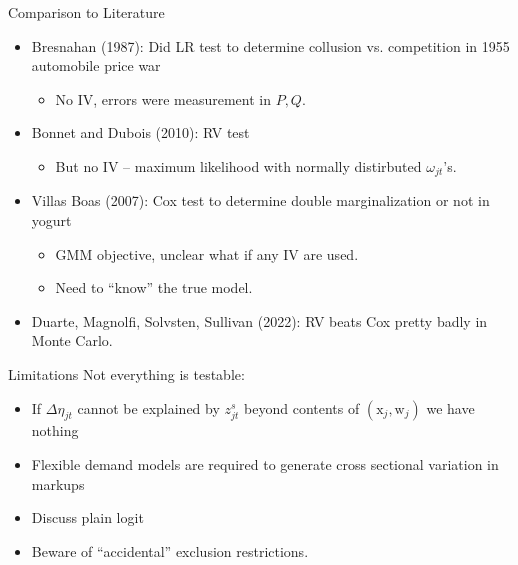 \documentclass[aspectratio=169,10pt]{beamer}
\begin{document}
\begin{frame}{Comparison to Literature}
\begin{itemize}
\item Bresnahan (1987): Did LR test to determine collusion vs. competition in 1955 automobile price war
\begin{itemize}
\item No IV, errors were measurement in $P,Q$.
\end{itemize}
\item Bonnet and Dubois (2010): RV test
\begin{itemize}
\item But no IV -- maximum likelihood with normally distirbuted $\omega_{jt}$'s.
\end{itemize}
\item Villas Boas (2007): Cox test to determine double marginalization or not in yogurt
\begin{itemize}
\item GMM objective, unclear what if any IV are used.
\item Need to ``know'' the true model.
\end{itemize}
\item Duarte, Magnolfi, Solvsten, Sullivan (2022): RV beats Cox pretty badly in Monte Carlo.
\end{itemize}
\end{frame}



\begin{frame}[plain]{Limitations}
Not everything is testable:
\begin{itemize}
\item If $\Delta \eta_{jt}$ cannot be explained by $z_{jt}^s$ beyond contents of $(\mathrm{x}_j,\mathrm{w}_j)$ we have nothing
\item Flexible demand models are required to generate cross sectional variation in markups
\item Discuss plain logit
\item Beware of ``accidental'' exclusion restrictions.
\end{itemize}
\end{frame}
\end{document}
